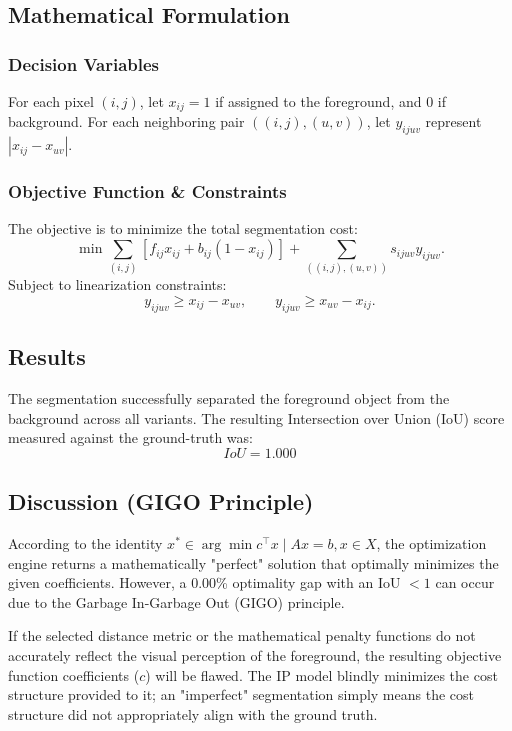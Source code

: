 \documentclass[11pt,a4paper]{article}
\begin{document}
\subsection*{Mathematical Formulation}

\subsubsection*{Decision Variables}
For each pixel $(i,j)$, let $x_{ij}=1$ if assigned to the foreground, and $0$ if background. For each neighboring pair $((i,j),(u,v))$, let $y_{ijuv}$ represent $|x_{ij}-x_{uv}|$.

\subsubsection*{Objective Function \& Constraints}
The objective is to minimize the total segmentation cost:
\[
\min \sum_{(i,j)} \left[f_{ij}x_{ij}+b_{ij}(1-x_{ij})\right] +\sum_{((i,j),(u,v))} s_{ijuv}y_{ijuv}.
\]
Subject to linearization constraints:
\[
y_{ijuv}\geq x_{ij}-x_{uv}, \qquad y_{ijuv}\geq x_{uv}-x_{ij}.
\]

\subsection*{Results}

The segmentation successfully separated the foreground object from the background across all variants. The resulting Intersection over Union (IoU) score measured against the ground-truth was:
\[
IoU = 1.000
\]

\subsection*{Discussion (GIGO Principle)}

According to the identity $x^* \in \arg\min c^\top x \mid Ax = b, x \in X$, the optimization engine returns a mathematically "perfect" solution that optimally minimizes the given coefficients. However, a 0.00\% optimality gap with an IoU $< 1$ can occur due to the Garbage In-Garbage Out (GIGO) principle. 

If the selected distance metric or the mathematical penalty functions do not accurately reflect the visual perception of the foreground, the resulting objective function coefficients ($c$) will be flawed. The IP model blindly minimizes the cost structure provided to it; an "imperfect" segmentation simply means the cost structure did not appropriately align with the ground truth.
\end{document}

